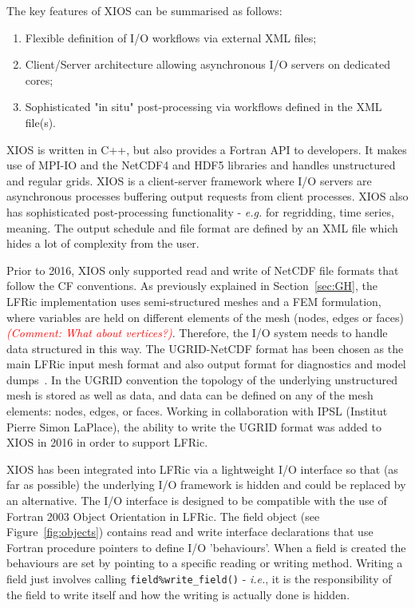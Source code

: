 \documentclass[times]{elsarticle}
\begin{document}
The key features of XIOS can be summarised as follows:
\begin{enumerate}
  \item Flexible definition of I/O workflows via external XML files;
  \item Client/Server architecture allowing asynchronous I/O servers on dedicated cores;
  \item Sophisticated "in situ" post-processing via workflows defined in the XML file(s). 
\end{enumerate}

XIOS is written in C++, but also provides a Fortran API to developers. It makes use of
MPI-IO and the NetCDF4 and HDF5 libraries and handles unstructured and regular grids.
XIOS is a client-server framework where I/O servers are asynchronous processes buffering
output requests from client processes. XIOS also has sophisticated post-processing
functionality - {\em e.g.} for regridding, time series, meaning. The output schedule and
file format are defined by an XML file which hides a lot of complexity from the user.

Prior to 2016, XIOS only supported read and write of NetCDF file formats that follow the CF
conventions.  As previously explained in Section~\ref{sec:GH}, the LFRic implementation uses
semi-structured meshes and a FEM formulation, where variables are held on
different elements of the mesh (nodes, edges or faces) \textcolor{red}{\em (Comment: What about vertices?)}.
Therefore, the I/O system needs to
handle data structured in this way. The UGRID-NetCDF format has been chosen as the main
LFRic input mesh format and also output format for diagnostics and model dumps~\cite{UgridSpec}.
In the UGRID convention the topology of the underlying unstructured mesh is stored as well as
data, and data can be defined on any of the mesh elements: nodes, edges, or faces.
Working in collaboration with IPSL (Institut Pierre Simon LaPlace), the ability to write the
UGRID format was added to XIOS in 2016 in order to support LFRic. 

XIOS has been integrated into LFRic via a lightweight I/O interface so
that (as far as possible) the underlying I/O framework is hidden and
could be replaced by an alternative.  The I/O interface is designed to
be compatible with the use of Fortran 2003 Object Orientation in
LFRic. The field object (see Figure~\ref{fig:objects}) contains read and write
interface declarations that use Fortran procedure pointers to define
I/O 'behaviours'. When a field is created the behaviours are set by
pointing to a specific reading or writing method. Writing a field just
involves calling \verb+field%write_field()+ - {\em i.e.}, it is the
responsibility of the field to write itself and how the writing is
actually done is hidden.
\end{document}
